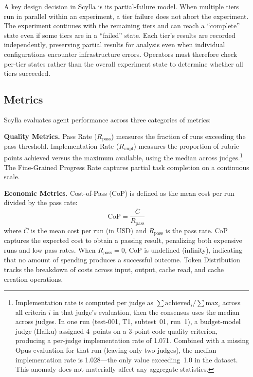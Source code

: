 \documentclass[11pt]{article}
\begin{document}
A key design decision in Scylla is its partial-failure model. When multiple
tiers run in parallel within an experiment, a tier failure does not abort the
experiment. The experiment continues with the remaining tiers and can reach a
``complete'' state even if some tiers are in a ``failed'' state. Each tier's
results are recorded independently, preserving partial results for analysis
even when individual configurations encounter infrastructure errors.
Operators must therefore check per-tier states rather than the overall
experiment state to determine whether all tiers succeeded.

\subsection{Metrics}
\label{sec:metrics}

Scylla evaluates agent performance across three categories of metrics:

\textbf{Quality Metrics.} Pass Rate ($R_{\text{pass}}$) measures the fraction
of runs exceeding the pass threshold. Implementation Rate ($R_{\text{impl}}$)
measures the proportion of rubric points achieved versus the maximum available,
using the median across judges.\footnote{Implementation rate is computed per
judge as $\sum \text{achieved}_i / \sum \text{max}_i$ across all criteria $i$
in that judge's evaluation, then the consensus uses the median across judges.
In one run (test-001, T1, subtest~01, run~1), a budget-model judge
(Haiku) assigned 4~points on a 3-point code quality criterion, producing a
per-judge implementation rate of 1.071. Combined with a missing Opus
evaluation for that run (leaving only two judges), the median implementation
rate is 1.028---the only value exceeding~1.0 in the dataset. This anomaly
does not materially affect any aggregate statistics.}
The Fine-Grained Progress Rate captures partial task completion on a continuous
scale.

\textbf{Economic Metrics.} Cost-of-Pass (CoP) is defined as the mean cost per
run divided by the pass rate:
\begin{equation}
  \text{CoP} = \frac{\overline{C}}{R_{\text{pass}}}
  \label{eq:cop}
\end{equation}
where $\overline{C}$ is the mean cost per run (in USD) and $R_{\text{pass}}$
is the pass rate. CoP captures the expected cost to obtain a passing result,
penalizing both expensive runs and low pass rates. When $R_{\text{pass}} = 0$,
CoP is undefined (infinity), indicating that no amount of spending produces a
successful outcome. Token Distribution tracks the breakdown of costs across
input, output, cache read, and cache creation operations.
\end{document}
